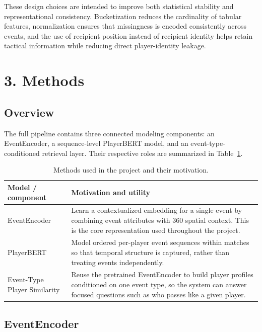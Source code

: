 \documentclass[11pt]{article}
\begin{document}
These design choices are intended to improve both statistical stability and representational consistency. Bucketization reduces the cardinality of tabular features, normalization ensures that missingness is encoded consistently across events, and the use of recipient position instead of recipient identity helps retain tactical information while reducing direct player-identity leakage.

\section{3. Methods}

\subsection{Overview}

The full pipeline contains three connected modeling components: an EventEncoder, a sequence-level PlayerBERT model, and an event-type-conditioned retrieval layer. Their respective roles are summarized in Table~\ref{tab:methods-overview}.

\begin{table}[H]
\centering
\caption{Methods used in the project and their motivation.}
\label{tab:methods-overview}
\begin{tabular}{>{\raggedright\arraybackslash}p{} >{\raggedright\arraybackslash}p{}}
\toprule
Model / component & Motivation and utility \\
\midrule
EventEncoder & Learn a contextualized embedding for a single event by combining event attributes with 360 spatial context. This is the core representation used throughout the project. \\
PlayerBERT & Model ordered per-player event sequences within matches so that temporal structure is captured, rather than treating events independently. \\
Event-Type Player Similarity & Reuse the pretrained EventEncoder to build player profiles conditioned on one event type, so the system can answer focused questions such as who passes like a given player. \\
\bottomrule
\end{tabular}
\end{table}

\subsection{EventEncoder}
\end{document}
